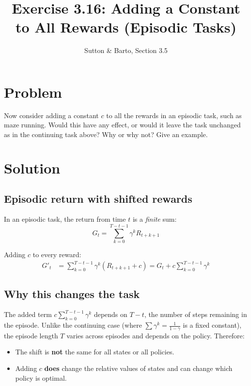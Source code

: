 \documentclass[11pt]{article}
\title{Exercise 3.16: Adding a Constant to All Rewards (Episodic Tasks)}
\author{Sutton \& Barto, Section 3.5}
\date{}
\begin{document}
\maketitle

\section*{Problem}

Now consider adding a constant $c$ to all the rewards in an episodic task,
such as maze running. Would this have any effect, or would it leave the task
unchanged as in the continuing task above? Why or why not? Give an example.

\section*{Solution}

\subsection*{Episodic return with shifted rewards}

In an episodic task, the return from time $t$ is a \emph{finite} sum:
\[
    G_t = \sum_{k=0}^{T-t-1} \gamma^k R_{t+k+1}
\]

Adding $c$ to every reward:
\begin{align*}
    G'_t &= \sum_{k=0}^{T-t-1} \gamma^k (R_{t+k+1} + c)
         = G_t + c \sum_{k=0}^{T-t-1} \gamma^k
\end{align*}

\subsection*{Why this changes the task}

The added term $c \sum_{k=0}^{T-t-1} \gamma^k$ depends on $T - t$, the number
of steps remaining in the episode. Unlike the continuing case (where $\sum \gamma^k
= \frac{1}{1-\gamma}$ is a fixed constant), the episode length $T$ varies across
episodes and depends on the policy. Therefore:

\begin{itemize}
    \item The shift is \textbf{not} the same for all states or all policies.
    \item Adding $c$ \textbf{does} change the relative values of states and can
          change which policy is optimal.
\end{itemize}
\end{document}
